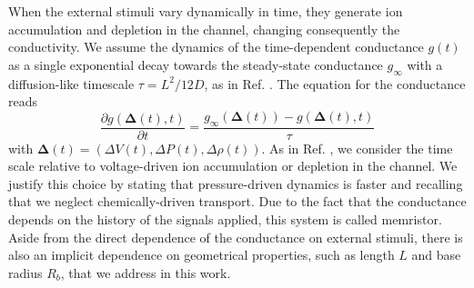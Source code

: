 \documentclass[reprint,superscriptaddress,prb,showkeys]{revtex4-2}
\newcommand{\brac}[1]{\left(#1 \right)} %
\begin{document}

When the external stimuli vary dynamically in time, they generate ion accumulation and depletion in the channel, changing consequently the conductivity. We assume the dynamics of the time-dependent conductance $g(t)$ as a single exponential decay towards the steady-state conductance $g_{\infty}$ with a diffusion-like timescale $\tau = L^2/12D$, as in Ref. \cite{Rene_IonicNeuromorphic}. The equation for the conductance reads
\begin{equation}
\frac{\partial g\brac{\boldsymbol{\Delta}(t), t}}{\partial t} = \frac{g_{\infty}\brac{\boldsymbol{\Delta}(t)}-g\brac{\boldsymbol{\Delta}(t), t}}{\tau}
\label{eq:eqofmotconductance}
\end{equation}
with $\boldsymbol{\Delta}(t) = \brac{\Delta V\brac{t},\Delta P\brac{t}, \Delta \rho\brac{t}}$.
As in Ref. \cite{Rene_IonicNeuromorphic}, we consider the time scale relative to voltage-driven ion accumulation or depletion in the channel. We justify this choice by stating that pressure-driven dynamics is faster and recalling that we neglect chemically-driven transport. Due to the fact that the conductance depends on the history of the signals applied, this system is called memristor. Aside from the direct dependence of the conductance on external stimuli, there is also an implicit dependence on geometrical properties, such as length $L$ and base radius $R_b$, that we address in this work.
\end{document}
